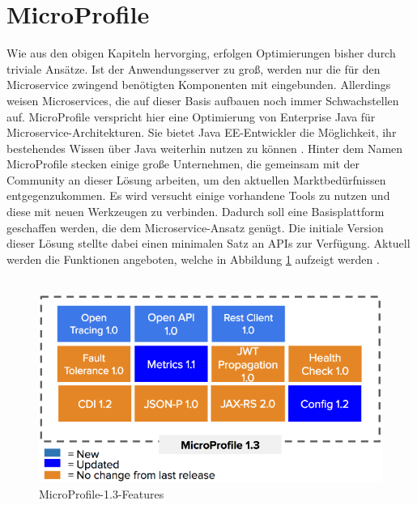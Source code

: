 \section{MicroProfile}
Wie aus den obigen Kapiteln hervorging, erfolgen Optimierungen bisher durch triviale Ansätze. Ist der Anwendungsserver zu groß, werden nur die für den Microservice zwingend benötigten Komponenten mit eingebunden. Allerdings weisen Microservices, die auf dieser Basis aufbauen noch immer Schwachstellen auf. MicroProfile verspricht hier eine Optimierung von Enterprise Java für Microservice-Architekturen. Sie bietet Java EE-Entwickler die Möglichkeit, ihr bestehendes Wissen über Java weiterhin nutzen zu können \cite{GabrielaMotroc.2016}. Hinter dem Namen MicroProfile stecken einige große Unternehmen, die gemeinsam mit der Community an dieser Lösung arbeiten, um den aktuellen Marktbedürfnissen entgegenzukommen. Es wird versucht einige vorhandene Tools zu nutzen und diese mit neuen Werkzeugen zu verbinden. Dadurch soll eine Basisplattform geschaffen werden, die dem Microservice-Ansatz genügt. Die initiale Version dieser Lösung stellte dabei einen minimalen Satz an APIs zur Verfügung. Aktuell werden die Funktionen angeboten, welche in Abbildung \ref{fig:features1.3} aufzeigt werden \cite{Microprofile.2017}.  \\ \\
\begin{figure}[h!]
	\includegraphics[width=1.0\linewidth]{images/Microprofile13}
	\caption{MicroProfile-1.3-Features \cite{Microprofile.2017}} %
	\label{fig:features1.3}
\end{figure}
